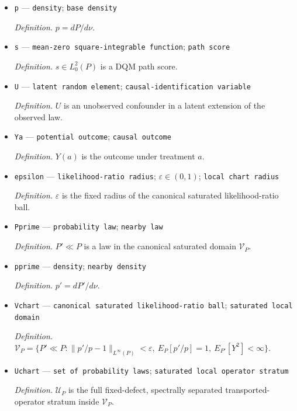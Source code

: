 \documentclass{article}
\begin{document}
\begin{itemize}
  \par\smallskip\noindent\emph{Definition.} \(z_{1-\alpha/2}=\Phi^{-1}(1-\alpha/2)\).
  \item \texttt{p} --- \texttt{density}; \texttt{base density}
  \par\smallskip\noindent\emph{Definition.} \(p=dP/d\nu\).
  \item \texttt{s} --- \texttt{mean-\allowbreak{}zero square-\allowbreak{}integrable function}; \texttt{path score}
  \par\smallskip\noindent\emph{Definition.} \(s\in L_0^2(P)\) is a DQM path score.
  \item \texttt{U} --- \texttt{latent random element}; \texttt{causal-\allowbreak{}identification variable}
  \par\smallskip\noindent\emph{Definition.} \(U\) is an unobserved confounder in a latent extension of the observed law.
  \item \texttt{Ya} --- \texttt{potential outcome}; \texttt{causal outcome}
  \par\smallskip\noindent\emph{Definition.} \(Y(a)\) is the outcome under treatment \(a\).
  \item \texttt{epsilon} --- \texttt{likelihood-\allowbreak{}ratio radius}; \(\varepsilon\in(0,1)\); \texttt{local chart radius}
  \par\smallskip\noindent\emph{Definition.} \(\varepsilon\) is the fixed radius of the canonical saturated likelihood-ratio ball.
  \item \texttt{Pprime} --- \texttt{probability law}; \texttt{nearby law}
  \par\smallskip\noindent\emph{Definition.} \(P'\ll P\) is a law in the canonical saturated domain \(\mathcal V_P\).
  \item \texttt{pprime} --- \texttt{density}; \texttt{nearby density}
  \par\smallskip\noindent\emph{Definition.} \(p'=dP'/d\nu\).
  \item \texttt{Vchart} --- \texttt{canonical saturated likelihood-\allowbreak{}ratio ball}; \texttt{saturated local domain}
  \par\smallskip\noindent\emph{Definition.} \(\mathcal V_P=\{P'\ll P:\|p'/p-1\|_{L^\infty(P)}<\varepsilon,\ E_P[p'/p]=1,\ E_{P'}[Y^2]<\infty\}\).
  \item \texttt{Uchart} --- \texttt{set of probability laws}; \texttt{saturated local operator stratum}
  \par\smallskip\noindent\emph{Definition.} \(\mathcal U_P\) is the full fixed-defect, spectrally separated transported-operator stratum inside \(\mathcal V_P\).

\end{itemize}
\end{document}
